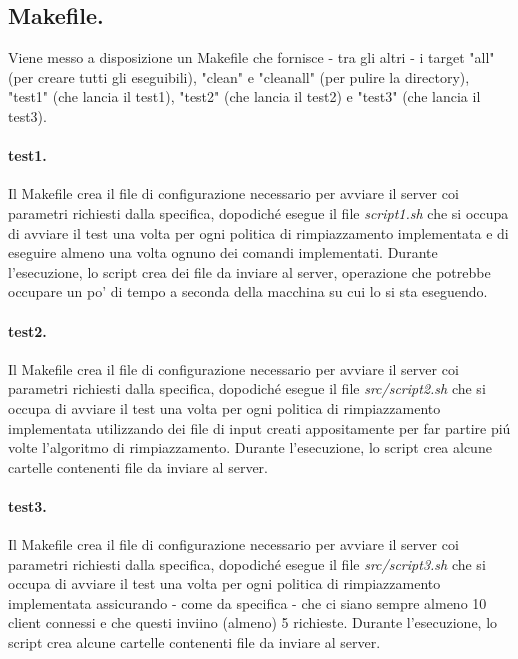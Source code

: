 \documentclass[11pt, italian, openany]{book}
\begin{document}
\begin{sloppypar}
\subsection{Makefile.}
Viene messo a disposizione un Makefile che fornisce - tra gli altri - i target "all" (per creare tutti gli eseguibili),
"clean" e "cleanall" (per pulire la directory), "test1" (che lancia il test1), "test2" (che lancia il test2) e "test3" (che
lancia il test3).

\paragraph*{test1.}
Il Makefile crea il file di configurazione necessario per avviare il server coi parametri richiesti dalla specifica, dopodich\'e
esegue il file \textit{script1.sh} che si occupa di avviare il test una volta per ogni politica di rimpiazzamento implementata e di
eseguire almeno una volta ognuno dei comandi implementati. Durante l'esecuzione, lo script crea dei file da inviare al server,
operazione che potrebbe occupare un po' di tempo a seconda della macchina su cui lo si sta eseguendo.

\paragraph*{test2.}
Il Makefile crea il file di configurazione necessario per avviare il server coi parametri richiesti dalla specifica, dopodich\'e
esegue il file \textit{src/script2.sh} che si occupa di avviare il test una volta per ogni politica di rimpiazzamento implementata
utilizzando dei file di input creati appositamente per far partire pi\'u volte l'algoritmo di rimpiazzamento. Durante l'esecuzione,
lo script crea alcune cartelle contenenti file da inviare al server.

\paragraph*{test3.}
Il Makefile crea il file di configurazione necessario per avviare il server coi parametri richiesti dalla specifica, dopodich\'e
esegue il file \textit{src/script3.sh} che si occupa di avviare il test una volta per ogni politica di rimpiazzamento implementata
assicurando - come da specifica - che ci siano sempre almeno 10 client connessi e che questi inviino (almeno) 5 richieste.
Durante l'esecuzione, lo script crea alcune cartelle contenenti file da inviare al server.


\end{sloppypar}
\end{document}
